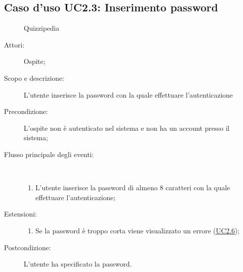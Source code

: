 \subsection{Caso d'uso UC2.3: Inserimento password}
	\begin{figure}[H]
		\centering
		\begin{resizedtikzpicture}{\textwidth}
		\begin{umlsystem}[x=0, fill=lightgray!20]{Quizzipedia}
		\end{umlsystem}
		\end{resizedtikzpicture}
		\caption{}
	\end{figure}
\begin{description}
\item[Attori:] Ospite;
\item[Scopo e descrizione:] L'utente inserisce la password con la quale effettuare l'autenticazione
      \item[Precondizione:] L'ospite non è autenticato nel sistema e non ha un account presso il sistema;

        \item[Flusso principale degli eventi:] \ 
 \begin{enumerate}
          \item L'utente inserisce la password di almeno 8 caratteri con la quale effettuare l'autenticazione;

      \end{enumerate}
    \item[Estensioni:]
      \begin{enumerate}
          \item Se la password è troppo corta viene visualizzato un errore	 (\hyperlink{UC2.6}{UC2.6});

      \end{enumerate}
    \item[Postcondizione:] L'utente ha specificato la password.
  \end{description}
\hypertarget{UC2.4}{}
